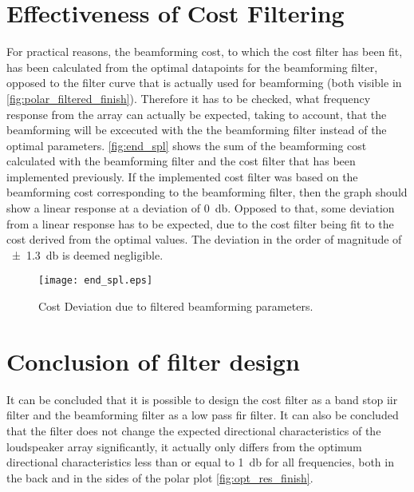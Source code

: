 \section{Effectiveness of Cost Filtering} 
For practical reasons, the beamforming cost, to which the cost filter has been fit, has been calculated from the optimal datapoints for the beamforming filter, opposed to the filter curve that is actually used for beamforming (both visible in \autoref{fig:polar_filtered_finish}). Therefore it has to be checked, what frequency response from the array can actually be expected, taking to account, that the beamforming will be excecuted with the the beamforming filter instead of the optimal parameters. \autoref{fig:end_spl} shows the sum of the beamforming cost calculated with the beamforming filter and the cost filter that has been implemented previously. If the implemented cost filter was based on the beamforming cost corresponding to the beamforming filter, then the graph should show a linear response at a deviation of \SI{0}{\decibel}. Opposed to that, some deviation from a linear response has to be expected, due to the cost filter being fit to the cost derived from the optimal values. The deviation in the order of magnitude of \SI{\pm 1.3}{\decibel} is deemed negligible.

\begin{figure}[H]
	\centering
	\texttt{[image: end\_spl.eps]}
	\caption{Cost Deviation due to filtered beamforming parameters.}
		\label{fig:end_spl}
\end{figure}



\section{Conclusion of filter design}
It can be concluded that it is possible to design the cost filter as a band stop \gls{iir} filter and the beamforming filter as a low pass \gls{fir} filter. It can also be concluded that the filter does not change the expected directional characteristics of the loudspeaker array significantly, it actually only differs from the optimum directional characteristics less than or equal to \SI{1}{\decibel} for all frequencies, both in the back and in the sides of the polar plot \autoref{fig:opt_res_finish}.





